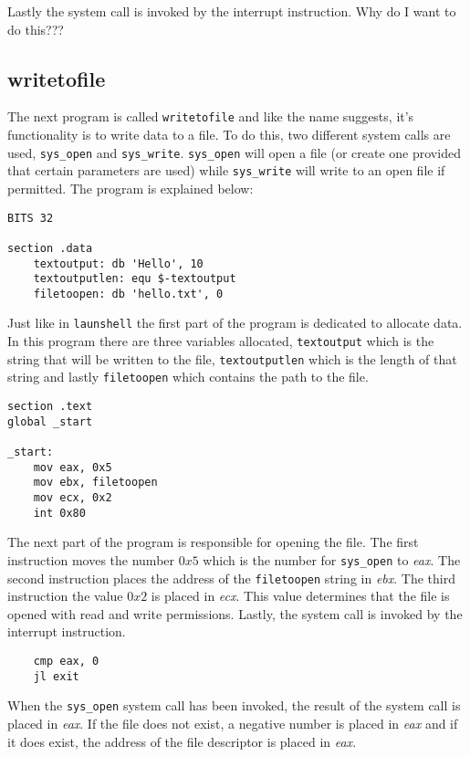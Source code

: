 \documentclass[11pt,twoside]{eitExjobb}
\begin{document}
Lastly the system call is invoked by the interrupt instruction.
Why do I want to do this???


\subsection{writetofile}
The next program is called \texttt{writetofile} and like the name suggests, it's functionality is to write data to a file. To do this, two different system calls are used, \texttt{sys\_open} and \texttt{sys\_write}. \texttt{sys\_open} will open a file (or create one provided that certain parameters are used) while \texttt{sys\_write} will write to an open file if permitted. The program is explained below:

\begin{verbatim}
BITS 32

section .data
    textoutput: db 'Hello', 10
    textoutputlen: equ $-textoutput
    filetoopen: db 'hello.txt', 0
\end{verbatim}

\noindent Just like in \texttt{launshell} the first part of the program is dedicated to allocate data. In this program there are three variables allocated, \texttt{textoutput} which is the string that will be written to the file, \texttt{textoutputlen} which is the length of that string and lastly \texttt{filetoopen} which contains the path to the file.

\begin{verbatim}
section .text
global _start

_start:
    mov eax, 0x5
    mov ebx, filetoopen
    mov ecx, 0x2
    int 0x80
\end{verbatim}

\noindent The next part of the program is responsible for opening the file. The first instruction moves the number $0x5$ which is the number for \texttt{sys\_open} to \emph{eax}. The second instruction places the address of the \texttt{filetoopen} string in \emph{ebx}. The third instruction the value $0x2$ is placed in \emph{ecx}. This value determines that the file is opened with read and write permissions. Lastly, the system call is invoked by the interrupt instruction.

\begin{verbatim}
    cmp eax, 0
    jl exit
\end{verbatim}

\noindent When the \texttt{sys\_open} system call has been invoked, the result of the system call is placed in \emph{eax}. If the file does not exist, a negative number is placed in \emph{eax} and if it does exist, the address of the file descriptor is placed in \emph{eax}. 
 
\end{document}
